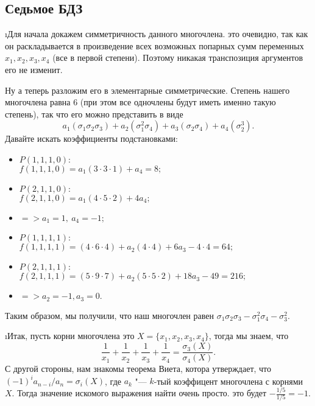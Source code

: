 \subsection{Седьмое БДЗ}

\i Для начала докажем симметричность данного многочлена. это очевидно, так как он раскладывается в произведение всех возможных попарных сумм переменных $x_1, x_2, x_3, x_4$ (все в первой степени). Поэтому никакая транспозиция аргументов его не изменит.
\par Ну а теперь разложим его в элементарные симметрические. Степень нашего многочлена равна 6 (при этом все одночлены будут иметь именно такую степень), так что его можно представить в виде
    $$a_1(\sigma_1\sigma_2\sigma_3) + a_2(\sigma_1^2\sigma_4) + a_3(\sigma_2\sigma_4) + a_4(\sigma_2^3).$$
Давайте искать коэффициенты подстановками:
\begin{itemize}
    \item $P(1, 1, 1, 0):$ \\
        $f(1, 1, 1, 0) = a_1(3\cdot3\cdot1) + a_4 = 8;$
    \item $P(2, 1, 1, 0):$ \\
        $f(2, 1, 1, 0) = a_1(4\cdot5\cdot2) + 4a_4;$
    \item $=> a_1 = 1,\ a_4 = -1;$
    \item $P(1, 1, 1, 1):$ \\
        $f(1, 1, 1, 1) = (4\cdot6\cdot4) + a_2(4\cdot4) + 6a_3 - 4\cdot4 = 64;$
    \item $P(2, 1, 1, 1):$ \\
        $f(2, 1, 1, 1) = (5\cdot9\cdot7) + a_2(5\cdot5\cdot2) + 18a_3 - 49 = 216;$
    \item $=> a_2 = -1, a_3 = 0.$
\end{itemize}
Таким образом, мы получили, что наш многочлен равен $\sigma_1\sigma_2\sigma_3 - \sigma_1^2\sigma_4 - \sigma_3^2.$


\i Итак, пусть корни многочлена это $X = \{x_1, x_2, x_3, x_4\}$, тогда мы знаем, что 
    $$\frac{1}{x_1} + \frac{1}{x_2} + \frac{1}{x_3} + \frac{1}{x_4} = \frac{\sigma_3(X)}{\sigma_4(X)}.$$
С другой стороны, нам знакомы теорема Виета, котора утверждает, что $(-1)^ia_{n-i}/a_n = \sigma_i(X)$, где $a_k$ "--- $k$-тый коэффицент многочлена с корнями $X$. Тогда значение искомого выражения найти очень просто. это будет $-\frac{1/5}{1/5} = -1$.


